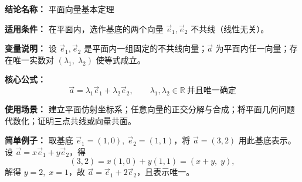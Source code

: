\textbf{结论名称：} 平面向量基本定理

\textbf{适用条件：} 在平面内，选作基底的两个向量 \(\vec{e}_1,\vec{e}_2\) 不共线（线性无关）。

\textbf{变量说明：} 设 \(\vec{e}_1,\vec{e}_2\) 是平面内一组固定的不共线向量；\(\vec{a}\) 为平面内任一向量；存在唯一实数对 \((\lambda_1,\;\lambda_2)\) 使等式成立。

\textbf{核心公式：}
\[
\boxed{\vec{a} = \lambda_1 \vec{e}_1 + \lambda_2 \vec{e}_2,\qquad \lambda_1,\lambda_2\in\mathbb{R}\ \text{并且唯一确定}}
\]

\textbf{使用场景：} 建立平面仿射坐标系；任意向量的正交分解与合成；将平面几何问题代数化；证明三点共线或向量共面。

\textbf{简单例子：} 取基底 \(\vec{e}_1=(1,0),\ \vec{e}_2=(1,1)\)，将 \(\vec{a}=(3,2)\) 用此基底表示。设 \(\vec{a}=x\vec{e}_1+y\vec{e}_2\)，得
\[
(3,2)=x(1,0)+y(1,1)=(x+y,\;y),
\]
解得 \(y=2,\;x=1\)，故 \(\vec{a}= \vec{e}_1 + 2\vec{e}_2\)，且表示唯一。